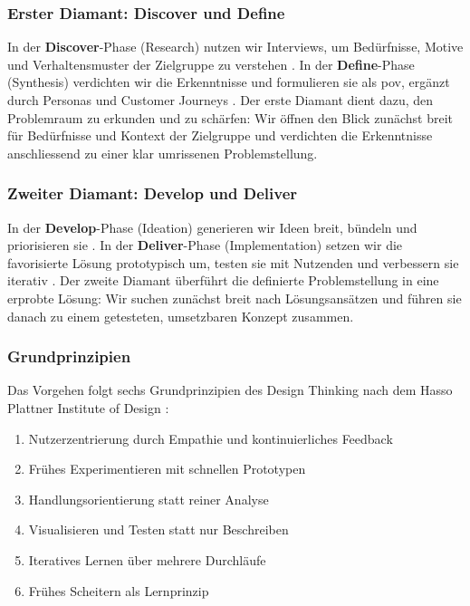 \subsubsection{Erster Diamant: Discover und Define}
In der \textbf{Discover}-Phase (Research) nutzen wir Interviews, um Bedürfnisse, Motive und Verhaltensmuster der Zielgruppe zu verstehen \parencite{graf2024}.
In der \textbf{Define}-Phase (Synthesis) verdichten wir die Erkenntnisse und formulieren sie als \gls{pov}, ergänzt durch Personas und Customer Journeys \parencite{stickdorn2011}.
Der erste Diamant dient dazu, den Problemraum zu erkunden und zu schärfen: Wir öffnen den Blick zunächst breit für Bedürfnisse und Kontext der Zielgruppe und verdichten die Erkenntnisse anschliessend zu einer klar umrissenen Problemstellung.

\subsubsection{Zweiter Diamant: Develop und Deliver}
In der \textbf{Develop}-Phase (Ideation) generieren wir Ideen breit, bündeln und priorisieren sie \parencite{graf2024}.
In der \textbf{Deliver}-Phase (Implementation) setzen wir die favorisierte Lösung prototypisch um, testen sie mit Nutzenden und verbessern sie iterativ \parencite{hpi2012}.
Der zweite Diamant überführt die definierte Problemstellung in eine erprobte Lösung: Wir suchen zunächst breit nach Lösungsansätzen und führen sie danach zu einem getesteten, umsetzbaren Konzept zusammen.

\subsubsection{Grundprinzipien}
Das Vorgehen folgt sechs Grundprinzipien des Design Thinking nach dem Hasso Plattner Institute of Design \parencite{hpi2012}:
\begin{enumerate}
  \item Nutzerzentrierung durch Empathie und kontinuierliches Feedback
  \item Frühes Experimentieren mit schnellen Prototypen
  \item Handlungsorientierung statt reiner Analyse
  \item Visualisieren und Testen statt nur Beschreiben
  \item Iteratives Lernen über mehrere Durchläufe
  \item Frühes Scheitern als Lernprinzip
\end{enumerate}
